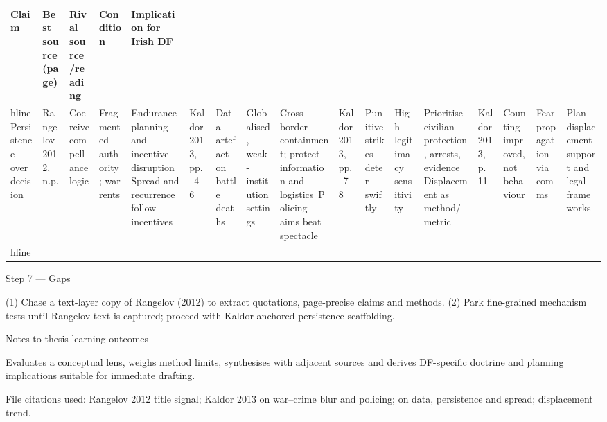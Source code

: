 \usepackage{array}
\begin{tabular}{p{3.2cm}p{4.2cm}p{3.6cm}p{3.2cm}p{4.2cm}}
	\textbf{Claim} & \textbf{Best source (page)} & \textbf{Rival source/reading} & \textbf{Condition} & \textbf{Implication for Irish DF}\\hline
	Persistence over decision & Rangelov 2012, n.p. & Coercive compellance logic & Fragmented authority; war rents & Endurance planning and incentive disruption\
	Spread and recurrence follow incentives & Kaldor 2013, pp.~4–6 & Data artefact on battle deaths & Globalised, weak-institution settings & Cross-border containment; protect information and logistics\
	Policing aims beat spectacle & Kaldor 2013, pp.~7–8 & Punitive strikes deter swiftly & High legitimacy sensitivity & Prioritise civilian protection, arrests, evidence\
	Displacement as method/metric & Kaldor 2013, p.~11 & Counting improved, not behaviour & Fear propagation via comms & Plan displacement support and legal frameworks\\hline
\end{tabular}

Step 7 — Gaps

(1) Chase a text-layer copy of Rangelov (2012) to extract quotations, page-precise claims and methods.
(2) Park fine-grained mechanism tests until Rangelov text is captured; proceed with Kaldor-anchored persistence scaffolding.

Notes to thesis learning outcomes

Evaluates a conceptual lens, weighs method limits, synthesises with adjacent sources and derives DF-specific doctrine and planning implications suitable for immediate drafting.

File citations used: Rangelov 2012 title signal; Kaldor 2013 on war–crime blur and policing; on data, persistence and spread; displacement trend.

\parencite{UKLP_2023}

